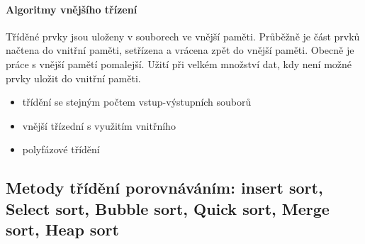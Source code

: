 \documentclass[10pt,a4paper]{article}
\begin{document}
\paragraph{Algoritmy vnějšího třízení} Tříděné prvky jsou uloženy v souborech ve vnější paměti. Průběžně je část prvků načtena do vnitřní paměti, setřízena a vrácena zpět do vnější paměti. Obecně je práce s vnější pamětí pomalejší. Užití při velkém množství dat, kdy není možné prvky uložit do vnitřní paměti.
\begin{itemize}
	\item třídění se stejným počtem vstup-výstupních souborů
	\item vnější třízední s využitím vnitřního
	\item polyfázové třídění
\end{itemize}




\subsection{Metody třídění porovnáváním: insert sort, Select sort, Bubble sort, Quick sort, Merge sort, Heap sort}
\end{document}
